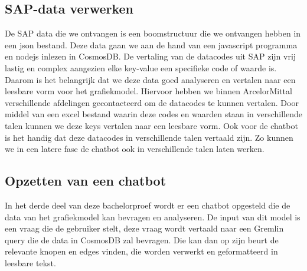 \subsection{SAP-data verwerken}
De SAP data die we ontvangen is een boomstructuur die we ontvangen hebben in een json bestand. Deze data gaan we aan de hand van een javascript programma en nodejs inlezen in CosmosDB.
De vertaling van de datacodes uit SAP zijn vrij lastig en complex aangezien elke key-value een specifieke code of waarde is. Daarom is het belangrijk dat we deze data goed analyseren en vertalen naar een leesbare vorm voor het grafiekmodel.
Hiervoor hebben we binnen ArcelorMittal verschillende afdelingen gecontacteerd om de datacodes te kunnen vertalen. Door middel van een excel bestand waarin deze codes en waarden staan in verschillende talen kunnen we deze keys vertalen naar een leesbare vorm.
Ook voor de chatbot is het handig dat deze datacodes in verschillende talen vertaald zijn. Zo kunnen we in een latere fase de chatbot ook in verschillende talen laten werken.

\subsection{Opzetten van een chatbot}
In het derde deel van deze bachelorproef wordt er een chatbot opgesteld die de data van het grafiekmodel kan bevragen en analyseren.
De input van dit model is een vraag die de gebruiker stelt, deze vraag wordt vertaald naar een Gremlin query die de data in CosmosDB zal bevragen.
Die kan dan op zijn beurt de relevante knopen en edges vinden, die worden verwerkt en geformatteerd in leesbare tekst.



